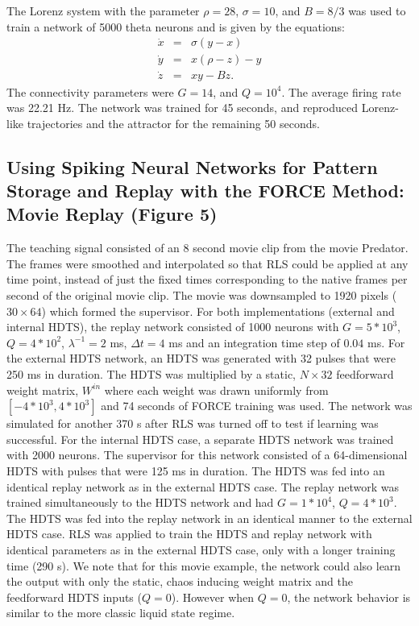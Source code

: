 \documentclass[11pt]{article} %
\begin{document}
The Lorenz system with the parameter $\rho = 28$, $\sigma = 10$, and $B=8/3$ 
was used to train a network of 5000 theta neurons and is given by the equations:
\begin{eqnarray*}
\dot{x} &=& \sigma(y-x)\\
\dot{y} &=& x(\rho - z) -y \\
\dot{z} &=& xy -B z.
\end{eqnarray*}
The connectivity parameters were $G=14$, and $Q=10^4$.  
The average firing rate was 22.21 Hz.  The network was trained for 45 seconds, 
and reproduced Lorenz-like trajectories and the attractor for the remaining 50 seconds. 






\subsection*{Using Spiking Neural Networks for Pattern Storage and Replay 
with the FORCE Method: Movie Replay (Figure 5)}

The teaching signal consisted of an 8 second movie clip from the movie Predator.  
The frames were smoothed and interpolated so that RLS could be applied at any time point, 
instead of just the fixed times corresponding to the native frames 
per second of the original movie clip.  The movie was downsampled to 
1920 pixels ($30\times 64$) which formed the supervisor.  
For both implementations (external and internal HDTS), the replay network consisted 
of 1000 neurons with $G=5*10^3$, $Q = 4*10^2$, $\lambda^{-1} =  2$ ms, 
$\Delta t = 4$ ms and an integration time step of $0.04$ ms.  
For the external HDTS network, an HDTS was generated with 32 pulses that 
were 250 ms in duration.  The HDTS was multiplied by a static, $N\times 32$ 
feedforward weight matrix, $W^{in}$ where each weight was drawn uniformly 
from $[-4*10^3,4*10^3]$ and 74 seconds of FORCE training was used.  
The network was simulated for another 370 s after RLS was turned off to test 
if learning was successful.  For the internal HDTS case, a separate 
HDTS network was trained with 2000 neurons.  The supervisor for this network 
consisted of a 64-dimensional HDTS with pulses that were 125 ms in duration.  
The HDTS was fed into an identical replay network as in the external HDTS case.  
The replay network was trained simultaneously to the HDTS network and 
had $G = 1*10^4$, $Q = 4*10^3$.  The HDTS was fed into the replay network 
in an identical manner to the external HDTS case.  RLS was applied to train 
the HDTS and replay network with identical parameters as in the external 
HDTS case, only with a longer training time (290 s).   We note that for this 
movie example, the network could also learn the output with only the static, 
chaos inducing weight matrix and the feedforward HDTS inputs ($Q=0$).  
However when $Q=0$, the network behavior is similar to the more classic 
liquid state regime.  
\end{document}
